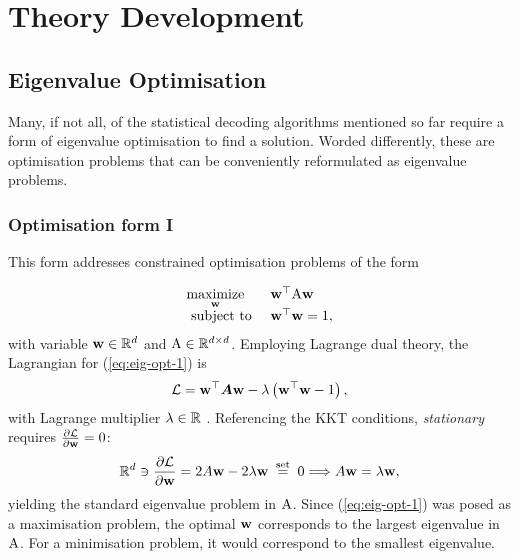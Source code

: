\chapter{Theory Development}
\label{chapter:theory-development}

\graphicspath{ {report/C3 Theory Development/assets/} } 

\section{Eigenvalue Optimisation}
Many, if not all, of the statistical decoding algorithms mentioned so far require a form of eigenvalue optimisation to find a solution. Worded differently, these are optimisation problems that can be conveniently reformulated as eigenvalue problems. 

\subsection{Optimisation form I}
\label{subsection:eig-opt-form-1}
This form addresses constrained optimisation problems of the form

\begin{equation}
\begin{array}{ll}
\underset{{\mathbf{w}}}{\operatorname{maximize}} & {\mathbf{w}}^{\top} {\textrm{A}} {\mathbf{w}} \\
\text { subject to } & {\mathbf{w}}^{\top} {\mathbf{w}}=1,
\end{array}
\label{eq:eig-opt-1}
\end{equation}
with variable ${\mathbf{w}} \in \mathbb{R}^{d}$ and ${\textrm{A}} \in \mathbb{R}^{d\times d}$. Employing Lagrange dual theory, the Lagrangian for (\ref{eq:eig-opt-1}) is 
\begin{equation}
\mathcal{L}={\mathbf{w}}^{\top} \boldsymbol{A} {\mathbf{w}}-\lambda\left({\mathbf{w}}^{\top} {\mathbf{w}}-1\right),
\end{equation}
with Lagrange multiplier $\lambda \in \mathbb{R}$ \cite{eig-tutorial}. Referencing the KKT conditions, \textit{stationary} requires $\frac{\partial \mathcal{L}}{\partial {\mathbf{w}}} = 0$:
\begin{equation}
\mathbb{R}^{d} \ni \frac{\partial \mathcal{L}}{\partial {\mathbf{w}}}=2 A {\mathbf{w}}-2 \lambda {\mathbf{w}} \stackrel{\text { set }}{=} 0 \Longrightarrow A {\mathbf{w}}=\lambda {\mathbf{w}},
\end{equation}
yielding the standard eigenvalue problem in ${\textrm{A}}$. Since (\ref{eq:eig-opt-1}) was posed as a maximisation problem, the optimal ${\mathbf{w}}$ corresponds to the largest eigenvalue in ${\textrm{A}}$. For a minimisation problem, it would correspond to the smallest eigenvalue.

